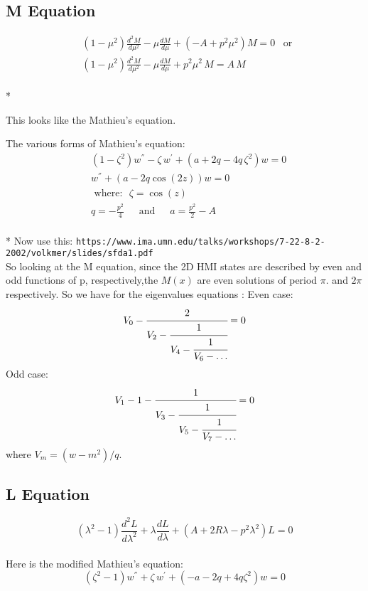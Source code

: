 \documentclass[11pt, oneside]{article}   	%
\begin{document}
\subsection*{M Equation}

\begin{equation}\label{M}
\begin{split}
 & \left(1 - \mu^2 \right) \frac{d^2M}{ d\mu^2 } - \mu\frac{ dM }{d\mu } +  \left(-A  + p^2\mu^2  \right)M = 0\,\,\,\text{ or } \\[.8em]
 & \left(1 - \mu^2 \right) \frac{d^2M}{ d\mu^2 } - \mu\frac{ dM }{d\mu } +   p^2\mu^2\,M = A\,M
 \end{split}
\end{equation}\\*

This looks like the Mathieu's equation.

The various forms of Mathieu's equation:
\begin{equation}
\begin{split}
& (1 - \zeta^2)w^{''} - \zeta\,w^{'} + (a + 2q - 4q\,\zeta^2)w = 0 \\[.8em]
& w^{''} +\left( a - 2q\cos (2z)\right)w = 0 \\[.8em]
& \text{ where: }\,\,\zeta = \cos(z)  \\[.8em]
& q = -\frac{p^2}{4}\,\,\,\,\,\,\,\text{ and  }\,\,\,\,\,\,\,a= \frac{p^2}{2} - A
\end{split}
\end{equation}\\*
Now use this: \verb+https://www.ima.umn.edu/talks/workshops/7-22-8-2-2002/volkmer/slides/sfda1.pdf+ \\[.8em]
So looking at the M  equation, since the 2D HMI states are described by even and odd functions of p, respectively,the $ M(x) $  are even solutions of period $ \pi $. and $ 2\pi $ respectively. So we have for the eigenvalues equations \cite{Laguerre1}:
Even case:
\begin{equation}
V_0 - \cfrac{2}{V_2-\cfrac{1}{V_4-\cfrac{1}{V_6 - \dots}}} = 0
\end{equation}
Odd case:
\begin{equation}
V_1 - 1 -\cfrac{1}{V_3-\cfrac{1}{V_5-\cfrac{1}{V_7 - \dots}}} = 0
\end{equation}
where $ V_m = (w - m^2)/q $.

\subsection*{L Equation}
\begin{equation}
\left(\lambda^2 - 1 \right) \frac{d^2L}{ d\lambda^2 }+\lambda\frac{ dL }{d\lambda }  + \left(A + 2R\lambda - p^2\lambda^2  \right)L = 0  \label{23}
\end{equation}\\[1.em]
Here is the modified Mathieu's equation:
\begin{equation}\label{LM}
\left(\zeta^2-1\right)w^{''} + \zeta\,w^{'} + \left(-a - 2q + 4q\zeta^2\right)w = 0 
\end{equation}
\end{document}

